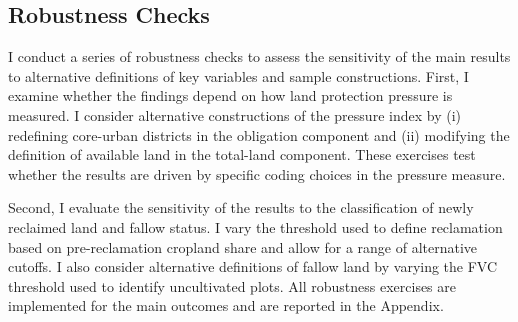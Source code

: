 \subsection{Robustness Checks}

I conduct a series of robustness checks to assess the sensitivity of the main results to alternative definitions of key variables and sample constructions. First, I examine whether the findings depend on how land protection pressure is measured. I consider alternative constructions of the pressure index by (i) redefining core-urban districts in the obligation component and (ii) modifying the definition of available land in the total-land component. These exercises test whether the results are driven by specific coding choices in the pressure measure.

Second, I evaluate the sensitivity of the results to the classification of newly reclaimed land and fallow status. I vary the threshold used to define reclamation based on pre-reclamation cropland share and allow for a range of alternative cutoffs. I also consider alternative definitions of fallow land by varying the FVC threshold used to identify uncultivated plots. All robustness exercises are implemented for the main outcomes and are reported in the Appendix.